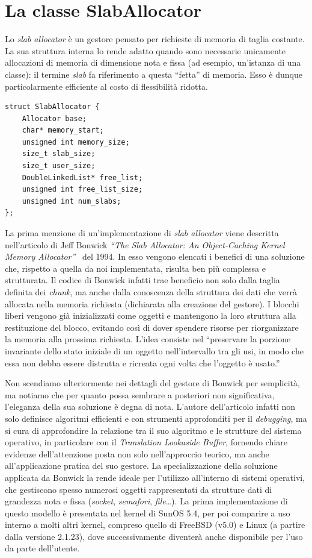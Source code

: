 
\section{La classe SlabAllocator}
Lo \textit{slab allocator} è un gestore pensato per richieste di memoria di taglia costante. La sua struttura interna lo rende adatto quando sono necessarie unicamente allocazioni di memoria di dimensione nota e fissa (ad esempio, un'istanza di una classe): il termine \textit{slab} fa riferimento a questa “fetta” di memoria. Esso è dunque particolarmente efficiente al costo di flessibilità ridotta.

\begin{lstlisting}
struct SlabAllocator {
    Allocator base;
    char* memory_start;
    unsigned int memory_size;
    size_t slab_size;   
    size_t user_size;
    DoubleLinkedList* free_list;   
    unsigned int free_list_size;
    unsigned int num_slabs;
};
\end{lstlisting}

La prima menzione di un’implementazione di \textit{slab allocator} viene descritta nell’articolo di Jeff Bonwick \textit{“The Slab Allocator: An Object-Caching Kernel Memory Allocator”}~\cite{slab} del 1994. In esso vengono elencati i benefici di una soluzione che, rispetto a quella da noi implementata, risulta ben più complessa e strutturata. Il codice di Bonwick infatti trae beneficio non solo dalla taglia definita dei \textit{chunk}, ma anche dalla conoscenza della struttura dei dati che verrà allocata nella memoria richiesta (dichiarata alla creazione del gestore). I blocchi liberi vengono già inizializzati come oggetti e mantengono la loro struttura alla restituzione del blocco, evitando così di dover spendere risorse per riorganizzare la memoria alla prossima richiesta. L’idea consiste nel “preservare la porzione invariante dello stato iniziale di un oggetto nell’intervallo tra gli usi, in modo che essa non debba essere distrutta e ricreata ogni volta che l’oggetto è usato.”

Non scendiamo ulteriormente nei dettagli del gestore di Bonwick per semplicità, ma notiamo che per quanto possa sembrare a posteriori non significativa, l’eleganza della sua soluzione è degna di nota. L’autore dell’articolo infatti non solo definisce algoritmi efficienti e con strumenti approfonditi per il \textit{debugging}, ma si cura di approfondire la relazione tra il suo algoritmo e le strutture del sistema operativo, in particolare con il \textit{Translation Lookaside Buffer}, fornendo chiare evidenze dell’attenzione posta non solo nell’approccio teorico, ma anche all’applicazione pratica del suo gestore. La specializzazione della soluzione applicata da Bonwick la rende ideale per l’utilizzo all’interno di sistemi operativi, che gestiscono spesso numerosi oggetti rappresentati da strutture dati di grandezza nota e fissa (\textit{socket}, \textit{semafori}, \textit{file}…). La prima implementazione di questo modello è presentata nel kernel di SunOS 5.4, per poi comparire a uso interno a molti altri kernel, compreso quello di FreeBSD (v5.0) e Linux (a partire dalla versione 2.1.23), dove successivamente diventerà anche disponibile per l’uso da parte dell’utente.

